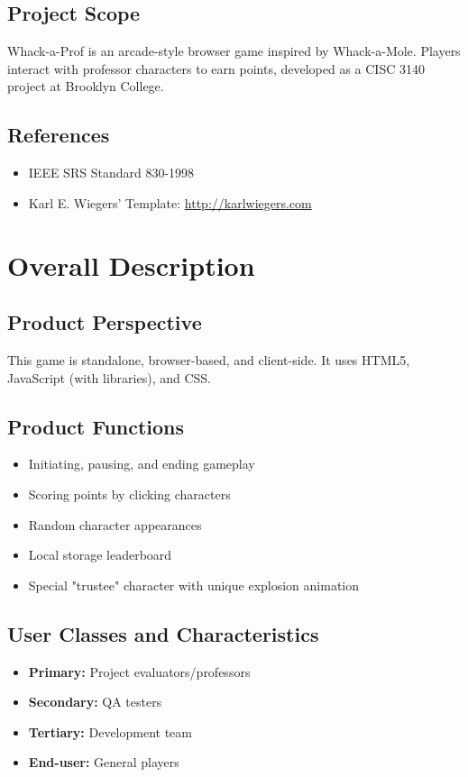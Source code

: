 \documentclass{scrreprt}
\begin{document}
\section{Project Scope}
Whack-a-Prof is an arcade-style browser game inspired by Whack-a-Mole. Players interact with professor characters to earn points, developed as a CISC 3140 project at Brooklyn College.

\section{References}
\begin{itemize}
    \item IEEE SRS Standard 830-1998
    \item Karl E. Wiegers’ Template: \url{http://karlwiegers.com}
\end{itemize}

\chapter{Overall Description}

\section{Product Perspective}
This game is standalone, browser-based, and client-side. It uses HTML5, JavaScript (with libraries), and CSS.

\section{Product Functions}
\begin{itemize}
    \item Initiating, pausing, and ending gameplay
    \item Scoring points by clicking characters
    \item Random character appearances
    \item Local storage leaderboard
    \item Special "trustee" character with unique explosion animation
\end{itemize}

\section{User Classes and Characteristics}
\begin{itemize}
    \item \textbf{Primary:} Project evaluators/professors
    \item \textbf{Secondary:} QA testers
    \item \textbf{Tertiary:} Development team
    \item \textbf{End-user:} General players
\end{itemize}
\end{document}
